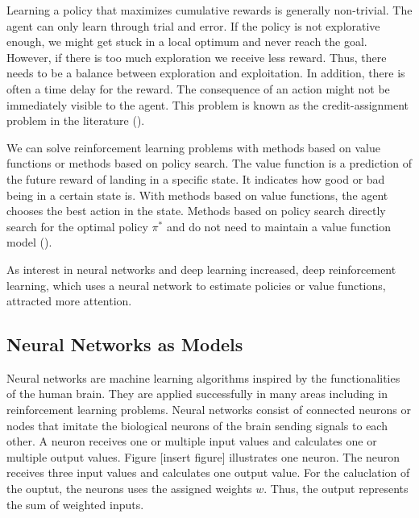 Learning a policy that maximizes cumulative rewards is generally non-trivial. The agent can only learn through trial and error. If the policy is not explorative enough, we might get stuck in a local optimum and never reach the goal. However, if there is too much exploration we receive less reward. Thus, there needs to be a balance between exploration and exploitation. In addition, there is often a time delay for the reward. The consequence of an action might not be immediately visible to the agent. This problem is known as the credit-assignment problem in the literature (\cite{sutton2018reinforcement}).

We can solve reinforcement learning problems with methods based on value functions or methods based on policy search. The value function is a prediction of the future reward of landing in a specific state. It indicates how good or bad being in a certain state is. With methods based on value functions, the agent chooses the best action in the state. Methods based on policy search directly search for the optimal policy $\pi^*$ and do not need to maintain a value function model (\cite{8103164}).

As interest in neural networks and deep learning increased, deep reinforcement learning, which uses a neural network to estimate policies or value functions, attracted more attention.


\subsection{Neural Networks as Models}
\label{subsec:NN}
Neural networks are machine learning algorithms inspired by the functionalities of the human brain. They are applied successfully in many areas including in reinforcement learning problems. Neural networks consist of connected neurons or nodes that imitate the biological neurons of the brain sending signals to each other. A neuron receives one or multiple input values and calculates one or multiple output values. Figure [insert figure] illustrates one neuron. The neuron receives three input values and calculates one output value. For the caluclation of the ouptut, the neurons uses the assigned weights $w$. Thus, the output represents the sum of weighted inputs.

